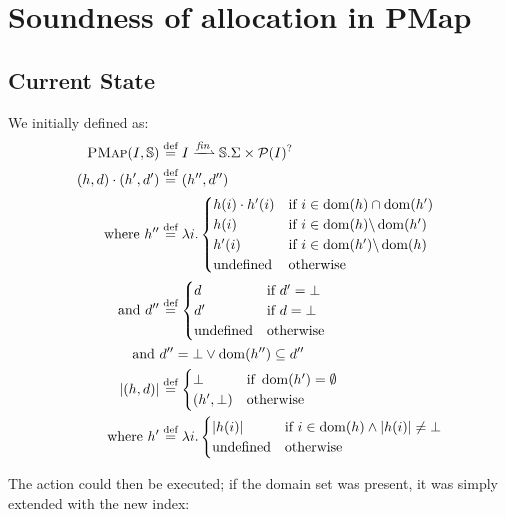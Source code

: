 \chapter{Soundness of allocation in PMap}

\section{Current State}

We initially defined \PMap{} as:
\begin{align*}
	\PMap(I,\mmdl) &\defeq I \finmap \mmdl.\Sigma \times \pset(I)^?\\
	(h,d)\cdot (h',d') &\defeq (h'', d'') \\
	\text{where } h''&\defeq \lambda i.\begin{cases}
		h(i)\cdot h'(i)&\If~i\in \dom(h)\cap\dom(h')\\
		h(i) &\If~i\in \dom(h) \backslash \dom(h')\\
		h'(i) &\If~i\in \dom(h') \backslash \dom(h)\\
		\text{undefined}&\Otherwise
	\end{cases}\\
	\text{and }d''&\defeq\begin{cases}
		d&\If~d'=\bot\\
		d'&\If~d=\bot\\
		\text{undefined}&\Otherwise
	\end{cases}\\
	\text{and }& d'' = \bot \lor \dom(h'')\subseteq d''\\
	|(h, d)| &\defeq \begin{cases}
		\bot &\If~\dom(h')=\emptyset\\
		(h', \bot) &\Otherwise
	\end{cases}\\
	\text{where }h'&\defeq \lambda i.\begin{cases}
		|h(i)| &\If~ i\in\dom(h) \land |h(i)| \neq \bot\\
		\text{undefined} &\Otherwise
	\end{cases}
\end{align*}

The \alloc{} action could then be executed; if the domain set was present, it was simply extended with the new index:

